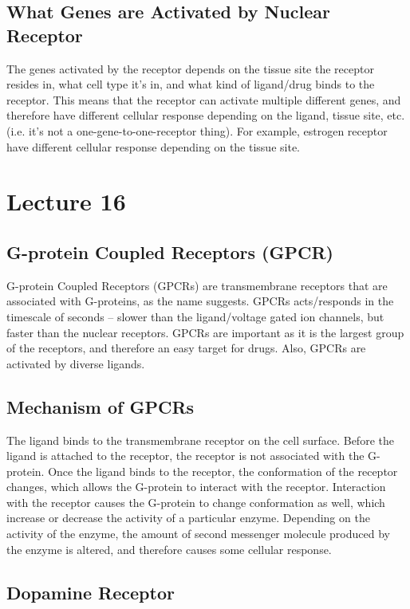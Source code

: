 \documentclass[a4paper, 12pt]{report}
\newcommand{\mychapter}[2]{
    \setcounter{chapter}{#1}
    \setcounter{section}{0}
    \chapter*{#2}
    \addcontentsline{toc}{chapter}{#2}
}
\begin{document}
\section{What Genes are Activated by Nuclear Receptor}

The genes activated by the receptor depends on the tissue site the receptor resides in, what cell type it's in, and what kind of ligand/drug binds to the receptor.
This means that the receptor can activate multiple different genes, and therefore have different cellular response depending on the ligand, tissue site, etc. (i.e. it's not a one-gene-to-one-receptor thing).
For example, estrogen receptor have different cellular response depending on the tissue site.

\mychapter{16}{Lecture 16}

\section{G-protein Coupled Receptors (GPCR)}

G-protein Coupled Receptors (GPCRs) are transmembrane receptors that are associated with G-proteins, as the name suggests.
GPCRs acts/responds in the timescale of seconds -- slower than the ligand/voltage gated ion channels, but faster than the nuclear receptors.
GPCRs are important as it is the largest group of the receptors, and therefore an easy target for drugs.
Also, GPCRs are activated by diverse ligands.

\section{Mechanism of GPCRs}

The ligand binds to the transmembrane receptor on the cell surface.
Before the ligand is attached to the receptor, the receptor is not associated with the G-protein.
Once the ligand binds to the receptor, the conformation of the receptor changes, which allows the G-protein to interact with the receptor.
Interaction with the receptor causes the G-protein to change conformation as well, which increase or decrease the activity of a particular enzyme.
Depending on the activity of the enzyme, the amount of second messenger molecule produced by the enzyme is altered, and therefore causes some cellular response.

\section{Dopamine Receptor}
\end{document}
